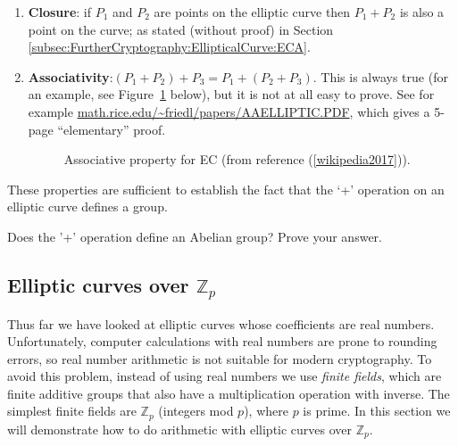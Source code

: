 \begin{enumerate}[1.]
\item \textbf{Closure}: if $P_1$ and $P_2$ are points on the elliptic curve then $P_1 + P_2$ is also a point on the curve; as stated (without proof) in Section \ref{subsec:FurtherCryptography:EllipticalCurve:ECA}.
\item \textbf{Associativity}:$(P_1 + P_2) + P_3 = P_1 + (P_2 + P_3)$. This is always true (for an example, see Figure~\ref{fig:DH:DHKE_12} below),  but it is not at all easy to prove. See for example \url{math.rice.edu/~friedl/papers/AAELLIPTIC.PDF}, which gives a 5-page ``elementary'' proof.
\begin{figure}[htbp]
	  \caption{\label{fig:DH:DHKE_12} Associative property for EC (from reference (\ref{wikipedia2017})).}
\end{figure}
\end{enumerate}

These properties are sufficient to establish the fact that the `+' operation on an elliptic curve defines a group.

\begin{exercise}{}
Does the '+' operation define an Abelian group? Prove your answer.
\end {exercise}

\subsection{Elliptic curves over $\mathbb{Z}_p$}\label{subsec:FurtherCryptography:EllipticalCurve:ECA2} 

Thus far we have looked at elliptic curves whose coefficients are real numbers. Unfortunately, computer calculations with real numbers are prone to rounding errors, so real number arithmetic is not suitable for modern cryptography. To avoid this problem,  instead of using real numbers we use \emph{finite fields}, which are finite additive groups that also have a multiplication operation with inverse. The simplest finite fields are  $\mathbb{Z}_p$ (integers mod $p$),  where $p$ is prime. In this section we will demonstrate how to do arithmetic with elliptic curves over $\mathbb{Z}_p$.

